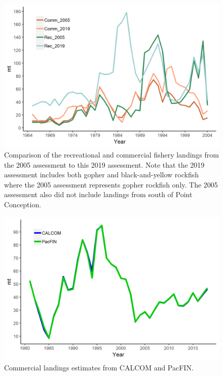 \documentclass[12pt,]{article}
\begin{document}
\begin{figure}
\centering
\includegraphics{Figures/assessment_compare.png}
\caption{Comparison of the recreational and commercial fishery landings
from the 2005 assessment to this 2019 assessment. Note that the 2019
assessment includes both gopher and black-and-yellow rockfish where the
2005 assessment represents gopher rockfish only. The 2005 assessment
also did not include landings from south of Point Conception.
\label{fig:Assessment_compare}}
\end{figure}

\begin{figure}
\centering
\includegraphics{Figures/Calcom_vs_Pacfin.png}
\caption{Commercial landings estimates from CALCOM and PacFIN.
\label{fig:Calcom_vs_Pacfin}}
\end{figure}
\end{document}
